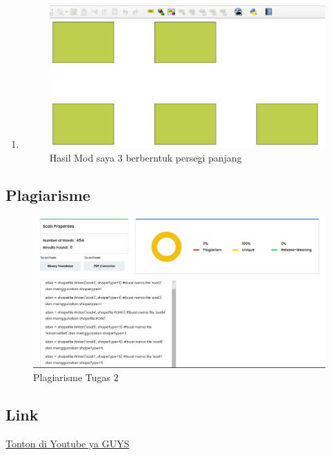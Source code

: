 \begin{enumerate}
    \item 
	
	\begin{figure}[H]
		\includegraphics[width=12cm]{figures/1174059/Python1/soal10.PNG}
		\centering
		\caption{Hasil Mod saya 3 berberntuk persegi panjang}
	\end{figure}
\end{enumerate}

\subsection {Plagiarisme}
\begin{figure}[H]
		\includegraphics[width=12cm]{figures/1174059/plagiarisme2.PNG}
		\centering
		\caption{Plagiarisme Tugas 2}
	\end{figure}

\subsection{Link}
 \href{https://youtu.be/JW8kgAV5X2E}{Tonton di Youtube ya GUYS}